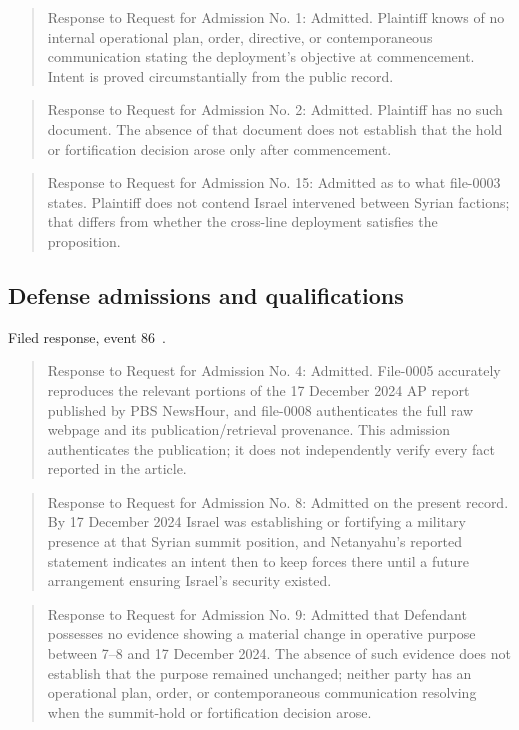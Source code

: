 \begin{quote}
Response to Request for Admission No. 1: Admitted. Plaintiff knows of no internal operational plan, order, directive, or contemporaneous communication stating the deployment's objective at commencement. Intent is proved circumstantially from the public record.
\end{quote}

\begin{quote}
Response to Request for Admission No. 2: Admitted. Plaintiff has no such document. The absence of that document does not establish that the hold or fortification decision arose only after commencement.
\end{quote}

\begin{quote}
Response to Request for Admission No. 15: Admitted as to what file-0003 states. Plaintiff does not contend Israel intervened between Syrian factions; that differs from whether the cross-line deployment satisfies the proposition.
\end{quote}

\subsection{Defense admissions and qualifications}

Filed response, event 86~\cite{record}.

\begin{quote}
Response to Request for Admission No. 4: Admitted. File-0005 accurately reproduces the relevant portions of the 17 December 2024 AP report published by PBS NewsHour, and file-0008 authenticates the full raw webpage and its publication/retrieval provenance. This admission authenticates the publication; it does not independently verify every fact reported in the article.
\end{quote}

\begin{quote}
Response to Request for Admission No. 8: Admitted on the present record. By 17 December 2024 Israel was establishing or fortifying a military presence at that Syrian summit position, and Netanyahu's reported statement indicates an intent then to keep forces there until a future arrangement ensuring Israel's security existed.
\end{quote}

\begin{quote}
Response to Request for Admission No. 9: Admitted that Defendant possesses no evidence showing a material change in operative purpose between 7–8 and 17 December 2024. The absence of such evidence does not establish that the purpose remained unchanged; neither party has an operational plan, order, or contemporaneous communication resolving when the summit-hold or fortification decision arose.
\end{quote}

